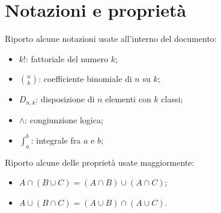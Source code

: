 \documentclass{report}
\begin{document}
	\chapter*{Notazioni e proprietà}
	Riporto alcune notazioni usate all'interno del documento:
	\begin{itemize}
		\item $k!$: fattoriale del numero $k$;
		\item $\binom{n}{k}$: coefficiente binomiale di $n$ su $k$;
		\item $D_{n, k}$: disposizione di $n$ elementi con $k$ classi;
		\item $\wedge$: congiunzione logica;
		\item $\int_a^b$: integrale fra $a$ e $b$;
	\end{itemize}
	Riporto alcune delle proprietà usate maggiormente:
	\begin{itemize}
		\item $A \cap (B \cup C) = (A \cap B) \cup (A \cap C)$;
		\item $A \cup (B \cap C) = (A \cup B) \cap (A \cup C)$.
	\end{itemize}
	\tableofcontents
	\newpage
\end{document}
